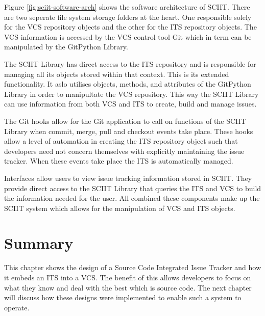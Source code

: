 \documentclass{mproj}
\begin{document}
Figure \ref{fig:sciit-software-arch} shows the software architecture of SCIIT. There are two seperate file system storage folders at the heart. One responsible solely for the VCS repository objects and the other for the ITS repository objects. The VCS information is accessed by the VCS control tool Git which in term can be manipulated by the GitPython Library. 

The SCIIT Library has direct access to the ITS repository and is responsible for managing all its objects stored within that context. This is its extended functionality. It aslo utilises objects, methods, and attributes of the GitPython Library in order to manipultate the VCS repository. This way the SCIIT Library can use information from both VCS and ITS to create, build and manage issues.

The Git hooks allow for the Git application to call on functions of the SCIIT Library when commit, merge, pull and checkout events take place. These hooks allow a level of automation in creating the ITS repository object such that developers need not concern themselves with explicitly maintaining the issue tracker. When these events take place the ITS is automatically managed.

Interfaces allow users to view issue tracking information stored in SCIIT. They provide direct access to the SCIIT Library that queries the ITS and VCS to build the information needed for the user. All combined these components make up the SCIIT system which allows for the manipulation of VCS and ITS objects.





\section{Summary}

This chapter shows the design of a Source Code Integrated Issue Tracker and how it embeds an ITS into a VCS. The benefit of this allows developers to focus on what they know and deal with the best which is source code. The next chapter will discuss how these designs were implemented to enable such a system to operate.









\end{document}
